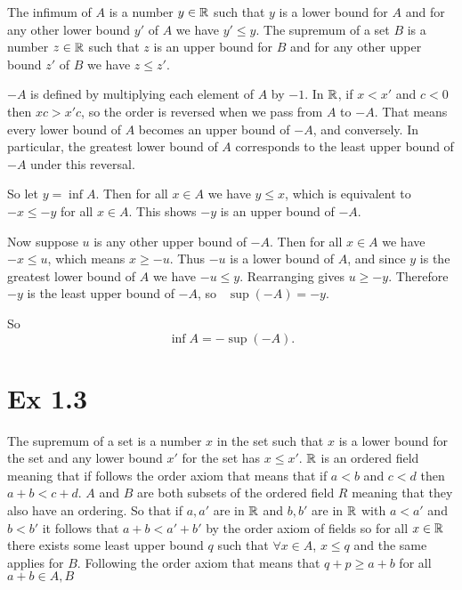 \documentclass{report}
\begin{document}
\begin{proofWithHibiscus}
  The infimum of $A$ is a number $y \in \mathbb{R}$ such that $y$ is a lower bound for $A$ and for any other lower bound $y'$ of $A$ we have $y' \leq y$. The supremum of a set $B$ is a number $z \in \mathbb{R}$ such that $z$ is an upper bound for $B$ and for any other upper bound $z'$ of $B$ we have $z \leq z'$. 
  
  $-A$ is defined by multiplying each element of $A$ by $-1$. In $\mathbb{R}$, if $x < x'$ and $c < 0$ then $xc > x'c$, so the order is reversed when we pass from $A$ to $-A$. That means every lower bound of $A$ becomes an upper bound of $-A$, and conversely. In particular, the greatest lower bound of $A$ corresponds to the least upper bound of $-A$ under this reversal.
  
  So let $y = \inf A$. Then for all $x \in A$ we have $y \leq x$, which is equivalent to $-x \leq -y$ for all $x \in A$. This shows $-y$ is an upper bound of $-A$. 
  
  Now suppose $u$ is any other upper bound of $-A$. Then for all $x \in A$ we have $-x \leq u$, which means $x \geq -u$. Thus $-u$ is a lower bound of $A$, and since $y$ is the greatest lower bound of $A$ we have $-u \leq y$. Rearranging gives $u \geq -y$. Therefore $-y$ is the least upper bound of $-A$, so \ $\sup(-A) = -y$. 
  
  So
  \[
  \inf A = -\sup(-A).
  \]
\end{proofWithHibiscus}
  

\section*{Ex 1.3}


\begin{proofWithHibiscus}
  The supremum of a set is a number $x$ in the set such that $x$ is a lower bound for the set and any lower bound 
  $x'$ for the set has $x \leq x'$. $\mathbb{R}$ is an ordered field meaning that if follows the order axiom 
  that means that if $a < b$ and $c < d$ then $a + b < c + d$. $A$ and $B$ are both subsets of the ordered field 
  $R$ meaning that they also have an ordering. So that if $a, a'$ are in $\mathbb{R}$ and $b,b'$ are in $\mathbb{R}$ with $a < a'$ and $b < b'$ it follows that $a + b < a' + b'$ 
  by the order axiom of fields so for all $x \in \mathbb{R}$ there exists some least upper bound $q$ such that 
  $\forall x \in A$, $x \leq q$ and the same applies for $B$. Following the order axiom that means that $q + p \geq a + b$ for 
  all $ a + b \in A, B$ 
\end{proofWithHibiscus}
\end{document}
